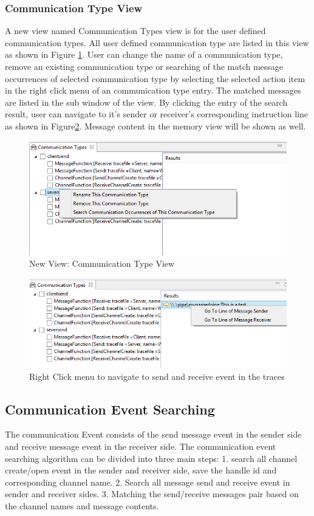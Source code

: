 \documentclass[paper=a4, fontsize=11pt]{scrartcl}
\numberwithin{equation}{section}		%
\numberwithin{figure}{section}			%
\numberwithin{table}{section}				%
\begin{document}
\subsubsection{Communication Type View}
A new view named Communication Types view is for the user defined communication types. All user defined communication type are listed in this view  as shown in Figure \ref{CommunicationTypeview}. User can change the name of a communication type, remove an existing communication type or searching of the match message occurrences of selected communication type by selecting the selected action item in the right click menu of an communication type entry. The matched messages are listed in the sub window of the view. By clicking the entry of the search  result, user can navigate to it's sender or receiver's corresponding instruction line as shown in Figure\ref{searchresult}. Message content in the memory view will be shown as well.


\begin{figure}[h]
\includegraphics{CommunicationTypeview}
 \caption{New View: Communication Type View}
\label{CommunicationTypeview}
\end{figure}

\begin{figure}[h]
\includegraphics{searchresult}
 \caption{Right Click menu to navigate to send and receive event in the traces}
\label{searchresult}
\end{figure}

\subsection{Communication Event Searching}
The communication Event consists of the send message event in the sender side and receive message event in the receiver side. The communication event searching algorithm can be divided into three main steps: 1. search all channel create/open event in the sender and receiver side, save the handle id and corresponding channel name. 2. Search all message send and receive event in sender and receiver sides. 3. Matching the send/receive messages pair based on the channel names and message contents.
\end{document}
